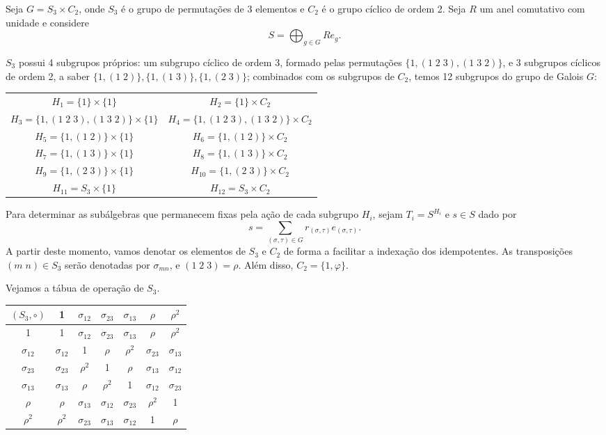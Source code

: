 \begin{exemplo}
Seja $G = S_3 \times C_2$, onde $S_3$ é o grupo de permutações de 3 elementos e $C_2$ é o grupo cíclico de ordem 2. Seja $R$ um anel comutativo com unidade e considere
\[S = \bigoplus_{g \in G}Re_g.\]

$S_3$ possui 4 subgrupos próprios: um subgrupo cíclico de ordem 3, formado pelas permutações $\{1, (1\;2\;3), (1\;3\;2)\}$, e 3 subgrupos cíclicos de ordem 2, a saber $\{1, (1\;2)\}, \{1, (1\;3)\}, \{1,(2\;3)\}$; combinados com os subgrupos de $C_2$, temos 12 subgrupos do grupo de Galois $G$:

\begin{table}[H]
    \centering
    \begin{tabular}{c c}
        $H_1 = \{1\} \times \{1\}$  & $H_2 = \{1\} \times C_2$ \\
        $H_3 = \{1, (1\;2\;3), (1\;3\;2)\} \times \{1\} $  & $H_4 = \{1, (1\;2\;3), (1\;3\;2)\} \times C_2 $ \\
        $H_5 = \{1, (1\;2)\} \times \{1\} $  & $H_6 = \{1, (1\;2)\} \times C_2$ \\
        $H_7 = \{1, (1\;3)\} \times \{1\} $  & $H_8 = \{1, (1\;3)\} \times C_2$ \\
        $H_9 = \{1,(2\;3)\} \times \{1\} $  & $H_{10} = \{1,(2\;3)\} \times C_2$ \\
        $H_{11} = S_3 \times \{1\} $  & $H_{12} = S_3 \times C_2$
    \end{tabular}
\end{table}

Para determinar as subálgebras que permanecem fixas pela ação de cada subgrupo $H_i$, sejam $T_i = S^{H_i}$ e $s \in S$ dado por
\[s = \sum_{(\sigma,\tau)\in G}r_{(\sigma,\tau)}e_{(\sigma,\tau)}.\]
A partir deste momento, vamos denotar os elementos de $S_3$ e $C_2$ de forma a facilitar a indexação dos idempotentes. As transposições $(m\;n) \in S_3$ serão denotadas por $\sigma_{mn}$, e $(1\;2\;3) = \rho$. Além disso, $C_2 = \{1, \varphi\}$.

Vejamos a tábua de operação de $S_3$.
\begin{table}[H]
\centering
\begin{tabular}{c|cccccc}
$(S_3, \circ)$ & 1 & $\sigma_{12}$ & $\sigma_{23}$ & $\sigma_{13}$ & $\rho$ & $\rho^2$ \\ \hline
1 & 1 & $\sigma_{12}$ & $\sigma_{23}$ & $\sigma_{13}$ & $\rho$ & $\rho^2$ \\
$\sigma_{12}$ & $\sigma_{12}$ & 1 & $\rho$ & $\rho^2$ & $\sigma_{23}$ & $\sigma_{13}$ \\
$\sigma_{23}$ & $\sigma_{23}$ & $\rho^2$ & 1 & $\rho$ & $\sigma_{13}$ & $\sigma_{12}$ \\
$\sigma_{13}$ & $\sigma_{13}$ & $\rho$ & $\rho^2$ & 1 & $\sigma_{12}$ & $\sigma_{23}$ \\
$\rho$ & $\rho$ & $\sigma_{13}$ & $\sigma_{12}$ & $\sigma_{23}$ & $\rho^2$ & 1 \\
$\rho^2$ & $\rho^2$ & $\sigma_{23}$ & $\sigma_{13}$ & $\sigma_{12}$ & 1 & $\rho$
\end{tabular}
\end{table}


\end{exemplo}
